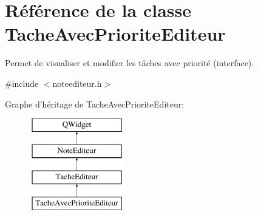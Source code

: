 \hypertarget{class_tache_avec_priorite_editeur}{\section{Référence de la classe Tache\-Avec\-Priorite\-Editeur}
\label{class_tache_avec_priorite_editeur}
}


Permet de visualiser et modifier les tâches avec priorité (interface).  




{\ttfamily \#include $<$noteediteur.\-h$>$}

Graphe d'héritage de Tache\-Avec\-Priorite\-Editeur\-:\begin{figure}[H]
\begin{center}
\leavevmode
\includegraphics[height=4.000000cm]{class_tache_avec_priorite_editeur}
\end{center}
\end{figure}
